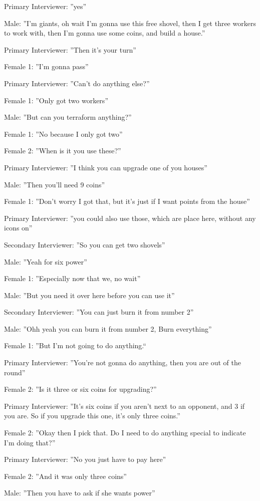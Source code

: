 Primary Interviewer: ”yes”

Male: ”I’m giants, oh wait I’m gonna use this free shovel, then I get three workers to work with, then I’m gonna use some coins, and build a house.”

Primary Interviewer: ”Then it’s your turn”

Female 1: ”I’m gonna pass”

Primary Interviewer: ”Can’t do anything else?”

Female 1: ”Only got two workers”

Male: ”But can you terraform anything?”

Female 1: ”No because I only got two”

Female 2: ”When is it you use these?”

Primary Interviewer: ”I think you can upgrade one of you houses”

Male: ”Then you’ll need 9 coins”

Female 1: ”Don’t worry I got that, but it’s just if I want points from the house”

Primary Interviewer: ”you could also use those, which are place here, without any icons on”

Secondary Interviewer: ”So you can get two shovels”

Male: ”Yeah for six power”

Female 1: ”Especially now that we, no wait”

Male: ”But you need it over here before you can use it”

Secondary Interviewer: ”You can just burn it from number 2”

Male: ”Ohh yeah you can burn it from number 2, Burn everything”

Female 1: ”But I’m not going to do anything.“

Primary Interviewer: ”You’re not gonna do anything, then you are out of the round”

Female 2: ”Is it three or six coins for upgrading?”

Primary Interviewer: ”It’s six coins if you aren’t next to an opponent, and 3 if you are. So if you upgrade this one, it’s only three coins.”

Female 2: ”Okay then I pick that. Do I need to do anything special to indicate I’m doing that?”

Primary Interviewer: ”No you just have to pay here”

Female 2: ”And it was only three coins”

Male: ”Then you have to ask if she wants power”

